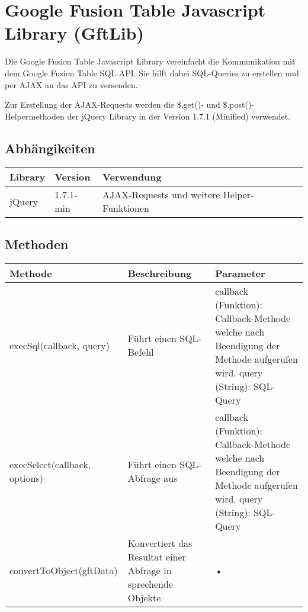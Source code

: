 \section{Google Fusion Table Javascript Library (GftLib)}
\label{gftlib-js}
Die Google Fusion Table Javascript Library vereinfacht die Kommunikation mit dem Google Fusion Table SQL API. Sie hilft dabei SQL-Queries zu erstellen und per AJAX an das API zu versenden.

Zur Erstellung der AJAX-Requests werden die \$.get()- und \$.post()-Helpermethoden der jQuery Library in der Version 1.7.1 (Minified) verwendet.


\subsection{Abhängikeiten}
\begin{longtable}{|l|l|p{11.5cm}|}
\hline 
\textbf{Library} & \textbf{Version} & \textbf{Verwendung} \\ 
\hline 
jQuery & 1.7.1-min & AJAX-Requests und weitere Helper-Funktionen \\ 
\hline 
\end{longtable} 

\subsection{Methoden}
\begin{longtable}{|l|p{4.5cm}|p{5cm}|}
\hline 
\textbf{Methode} & \textbf{Beschreibung} & \textbf{Parameter} \\ 
\hline 
execSql(callback, query) & Führt einen SQL-Befehl & callback (Funktion): Callback-Methode welche nach Beendigung der Methode aufgerufen wird. query (String): SQL-Query \\ 
\hline 
execSelect(callback, options) & Führt einen SQL-Abfrage aus & callback (Funktion): Callback-Methode welche nach Beendigung der Methode aufgerufen wird. query (String): SQL-Query \\ 
\hline 
convertToObject(gftData) & Konvertiert das Resultat einer Abfrage in sprechende Objekte & • \\ 
\hline 
\end{longtable} 